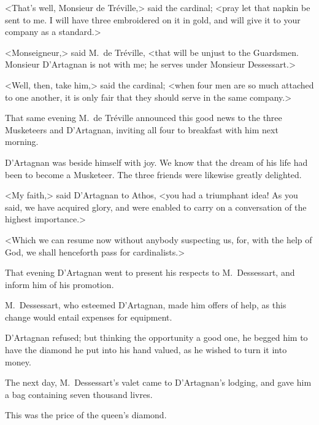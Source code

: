 <That's well, Monsieur de Tréville,> said the cardinal; <pray let that napkin be sent to me. I will have three  embroidered on it in gold, and will give it to your company as a standard.> 

<Monseigneur,> said M.~de Tréville, <that will be unjust to the Guardsmen. Monsieur D'Artagnan is not with me; he serves under Monsieur Dessessart.> 

<Well, then, take him,> said the cardinal; <when four men are so much attached to one another, it is only fair that they should serve in the same company.> 

That same evening M.~de Tréville announced this good news to the three Musketeers and D'Artagnan, inviting all four to breakfast with him next morning. 

D'Artagnan was beside himself with joy. We know that the dream of his life had been to become a Musketeer. The three friends were likewise greatly delighted. 

<My faith,> said D'Artagnan to Athos, <you had a triumphant idea! As you said, we have acquired glory, and were enabled to carry on a conversation of the highest importance.> 

<Which we can resume now without anybody suspecting us, for, with the help of God, we shall henceforth pass for cardinalists.> 

That evening D'Artagnan went to present his respects to M.~Dessessart, and inform him of his promotion. 

M.~Dessessart, who esteemed D'Artagnan, made him offers of help, as this change would entail expenses for equipment. 

D'Artagnan refused; but thinking the opportunity a good one, he begged him to have the diamond he put into his hand valued, as he wished to turn it into money. 

The next day, M.~Dessessart's valet came to D'Artagnan's lodging, and gave him a bag containing seven thousand livres. 

This was the price of the queen's diamond.